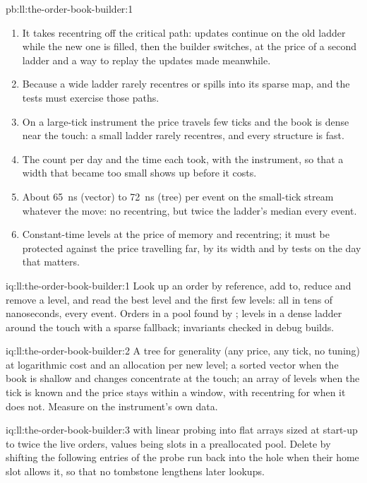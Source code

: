 \begin{solution}{pb:ll:the-order-book-builder:1}
\begin{enumerate}
\item It takes recentring off the critical path: updates continue on the old ladder while the new one is filled, then the
builder switches, at the price of a second ladder and a way to replay the updates made meanwhile.
\item Because a wide ladder rarely recentres or spills into its sparse map, and the tests must exercise those paths.
\item On a large-tick instrument the price travels few ticks and the book is dense near the touch: a small ladder rarely
recentres, and every structure is fast.
\item The count per day and the time each took, with the instrument, so that a width that became too small shows up before it
costs.
\item About \qty{65}{\nano\second} (vector) to \qty{72}{\nano\second} (tree) per event on the small-tick stream whatever the move: no recentring, but twice the ladder's
median every event.
\item Constant-time levels at the price of memory and recentring; it must be protected against the price travelling far,
by its width and by tests on the day that matters.
\end{enumerate}
\end{solution}

\begin{solution}{iq:ll:the-order-book-builder:1}
Look up an order by reference, add to, reduce and remove a level, and read the best level and the first few levels: all in
tens of nanoseconds, every event. Orders in a pool found by ; levels in a dense ladder around the touch with a
sparse fallback; invariants checked in debug builds.
\end{solution}

\begin{solution}{iq:ll:the-order-book-builder:2}
A tree for generality (any price, any tick, no tuning) at logarithmic cost and an allocation per new level; a sorted vector
when the book is shallow and changes concentrate at the touch; an array of levels when the tick is known and the price stays
within a window, with recentring for when it does not. Measure on the instrument's own data.
\end{solution}

\begin{solution}{iq:ll:the-order-book-builder:3}
 with linear probing into flat arrays sized at start-up to twice the live orders, values being slots in a
preallocated pool. Delete by shifting the following entries of the probe run back into the hole when their home slot allows
it, so that no tombstone lengthens later lookups.
\end{solution}

